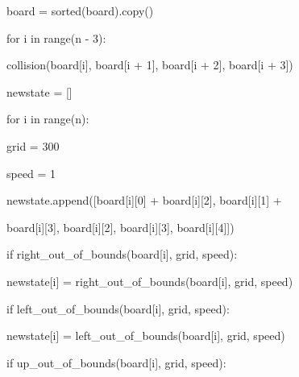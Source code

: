 \documentclass{article}
\begin{document}
{\vspace{8.383pt}    board = sorted(board).copy()                                                     

\vspace{21.46pt} 

\vspace{-0.048pt}    for i in range\hspace{0.138pt}(n - 3): 

\vspace{0.193pt}        collision(board[i], board[i + 1], board[i + 2], board[i + 3]) 

\vspace{13.731pt} 

\vspace{0.193pt}    newstate = [] 

\vspace{-0.018pt}    for i in range\hspace{0.138pt}(n): 

\vspace{0.434pt}        grid = 300 

\vspace{0.193pt}        speed = 1 

\vspace{8.142pt}\hspace{53.024pt}newstate.append([board[i][0] + board[i][2], board[i][1] +               

\vspace{0.434pt}\hspace{53.024pt}board[i][3], board[i][2], board[i][3], board[i][4]]) 

\vspace{21.44pt} 

\vspace{-0.028pt}        if right\_{}out\_{}of\_{}bounds\hspace{0.238pt}(board[i], grid, speed): 

\vspace{0.434pt}            newstate[i] = right\_{}out\_{}of\_{}bounds(board[i], grid, speed) 

\vspace{-0.048pt}        if left\_{}out\_{}of\_{}bounds(board[i], grid, speed): 

\vspace{0.434pt}            newstate[i] = left\_{}out\_{}of\_{}bounds(board[i], grid, speed) 

\vspace{-0.048pt}        if up\_{}out\_{}of\_{}bounds(board[i], grid, speed): 

}
\end{document}
